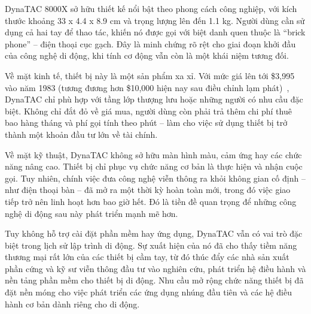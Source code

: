 \begin{flushleft}
  \hspace*{0.8cm}DynaTAC 8000X sở hữu thiết kế nổi bật theo phong cách công nghiệp, với kích thước khoảng 33 x 4.4 x 8.9 cm và trọng lượng lên đến 1.1 kg. Người dùng cần sử dụng cả hai tay để thao tác, khiến nó được gọi với biệt danh quen thuộc là “brick phone” – điện thoại cục gạch. Đây là minh chứng rõ rệt cho giai đoạn khởi đầu của công nghệ di động, khi tính cơ động vẫn còn là một khái niệm tương đối.
\end{flushleft}

\begin{flushleft}
  \hspace*{0.8cm}Về mặt kinh tế, thiết bị này là một sản phẩm xa xỉ. Với mức giá lên tới \$3,995 vào năm 1983 (tương đương hơn \$10,000 hiện nay sau điều chỉnh lạm phát)~\cite{dynatacprice}, DynaTAC chỉ phù hợp với tầng lớp thượng lưu hoặc những người có nhu cầu đặc biệt. Không chỉ đắt đỏ về giá mua, người dùng còn phải trả thêm chi phí thuê bao hàng tháng và phí gọi tính theo phút – làm cho việc sử dụng thiết bị trở thành một khoản đầu tư lớn về tài chính.
\end{flushleft}

\begin{flushleft}
  \hspace*{0.8cm}Về mặt kỹ thuật, DynaTAC không sở hữu màn hình màu, cảm ứng hay các chức năng nâng cao. Thiết bị chỉ phục vụ chức năng cơ bản là thực hiện và nhận cuộc gọi. Tuy nhiên, chính việc đưa công nghệ viễn thông ra khỏi không gian cố định – như điện thoại bàn – đã mở ra một thời kỳ hoàn toàn mới, trong đó việc giao tiếp trở nên linh hoạt hơn bao giờ hết. Đó là tiền đề quan trọng để những công nghệ di động sau này phát triển mạnh mẽ hơn.
\end{flushleft}

\begin{flushleft}
  \hspace*{0.8cm}Tuy không hỗ trợ cài đặt phần mềm hay ứng dụng, DynaTAC vẫn có vai trò đặc biệt trong lịch sử lập trình di động. Sự xuất hiện của nó đã cho thấy tiềm năng thương mại rất lớn của các thiết bị cầm tay, từ đó thúc đẩy các nhà sản xuất phần cứng và kỹ sư viễn thông đầu tư vào nghiên cứu, phát triển hệ điều hành và nền tảng phần mềm cho thiết bị di động. Nhu cầu mở rộng chức năng thiết bị đã đặt nền móng cho việc phát triển các ứng dụng nhúng đầu tiên và các hệ điều hành cơ bản dành riêng cho di động.
\end{flushleft}

